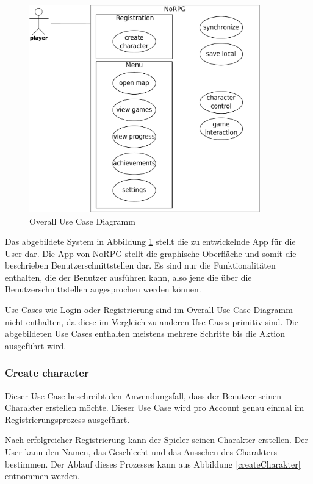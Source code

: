 		\begin{figure}[htbp]
			\centering 
			\label{oucd}
			\includegraphics[width=10cm]{pics/OUCD.pdf}
			\caption{Overall Use Case Diagramm}
		\end{figure}
		
		Das abgebildete System in Abbildung \ref{oucd} stellt die zu entwickelnde App für die User dar. Die App von NoRPG stellt die graphische Oberfläche und somit die beschrieben Benutzerschnittstellen dar. Es sind nur die Funktionalitäten enthalten, die der Benutzer ausführen kann, also jene die über die Benutzerschnittstellen angesprochen werden können. 
		
		Use Cases wie Login oder Registrierung sind im Overall Use Case Diagramm nicht enthalten, da diese im Vergleich zu anderen Use Cases primitiv sind. Die abgebildeten Use Cases enthalten meistens mehrere Schritte bis die Aktion ausgeführt wird.
	
		\subsubsection{Create character}
			Dieser Use Case beschreibt den Anwendungsfall, dass der Benutzer seinen Charakter erstellen möchte. Dieser Use Case wird pro Account genau einmal im Registrierungsprozess ausgeführt.
			
			Nach erfolgreicher Registrierung kann der Spieler seinen Charakter erstellen. Der User kann den Namen, das Geschlecht und das Aussehen des Charakters bestimmen. Der Ablauf dieses Prozesses kann aus Abbildung \ref{createCharakter} entnommen werden.
			
